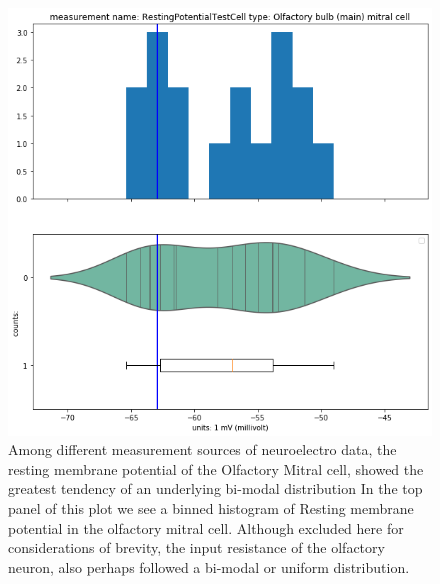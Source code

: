 \begin{figure}  
\begin{center}     
  \includegraphics[scale=0.8]{chapters/notebooks_converted/needata_thesis_files/needata_thesis_5_22}
      \caption{Among different measurement sources of neuroelectro data, the resting membrane potential of the Olfactory Mitral cell, showed the greatest tendency of an underlying bi-modal distribution
      In the top panel of this plot we see a binned histogram of Resting membrane potential in the olfactory mitral cell. Although excluded here for considerations of brevity, the input resistance of the olfactory neuron, also perhaps followed a bi-modal or uniform distribution. 
      }
\end{center}     
\end{figure}
%
    
